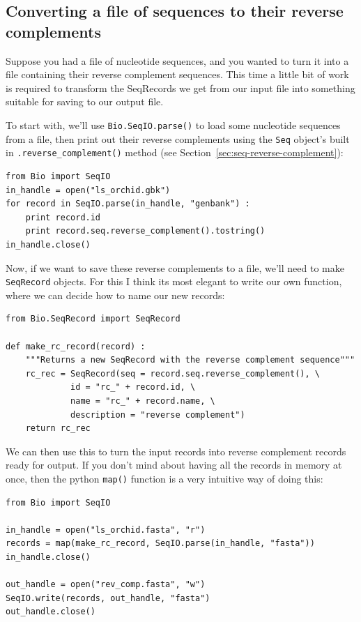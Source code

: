 \documentclass{report}
\begin{document}
\subsection{Converting a file of sequences to their reverse complements}

Suppose you had a file of nucleotide sequences, and you wanted to turn it into a file containing their reverse complement sequences.  This time a little bit of work is required to transform the SeqRecords we get from our input file into something suitable for saving to our output file.

To start with, we'll use \verb|Bio.SeqIO.parse()| to load some nucleotide
sequences from a file, then print out their reverse complements using
the \verb|Seq| object's built in \verb|.reverse_complement()| method (see Section~\ref{sec:seq-reverse-complement}):

\begin{verbatim}
from Bio import SeqIO
in_handle = open("ls_orchid.gbk")
for record in SeqIO.parse(in_handle, "genbank") :
    print record.id
    print record.seq.reverse_complement().tostring()
in_handle.close()
\end{verbatim}

Now, if we want to save these reverse complements to a file, we'll need to make \verb|SeqRecord| objects.
For this I think its most elegant to write our own function, where we can decide how to name our
new records:

\begin{verbatim}
from Bio.SeqRecord import SeqRecord

def make_rc_record(record) :
    """Returns a new SeqRecord with the reverse complement sequence"""
    rc_rec = SeqRecord(seq = record.seq.reverse_complement(), \
             id = "rc_" + record.id, \
             name = "rc_" + record.name, \
             description = "reverse complement")
    return rc_rec
\end{verbatim}

We can then use this to turn the input records into reverse complement records ready for output.  If you don't mind about having all the records in memory at once, then the python \verb|map()| function is a very intuitive way of doing this:

\begin{verbatim}
from Bio import SeqIO

in_handle = open("ls_orchid.fasta", "r")
records = map(make_rc_record, SeqIO.parse(in_handle, "fasta"))
in_handle.close()

out_handle = open("rev_comp.fasta", "w")
SeqIO.write(records, out_handle, "fasta")
out_handle.close()
\end{verbatim}
\end{document}
